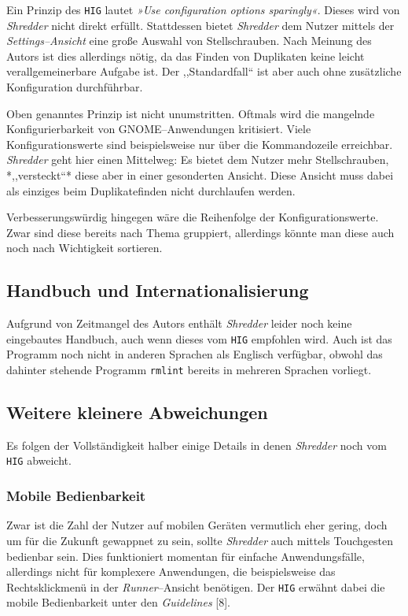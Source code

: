 \documentclass[11pt,ngerman,toc=listof,index=totoc]{scrreprt}
\begin{document}
Ein Prinzip des \texttt{HIG} lautet \emph{»Use configuration options
sparingly«}. Dieses wird von \emph{Shredder} nicht direkt erfüllt.
Stattdessen bietet \emph{Shredder} dem Nutzer mittels der
\emph{Settings--Ansicht} eine große Auswahl von Stellschrauben. Nach
Meinung des Autors ist dies allerdings nötig, da das Finden von
Duplikaten keine leicht verallgemeinerbare Aufgabe ist. Der
,,Standardfall`` ist aber auch ohne zusätzliche Konfiguration
durchführbar.

Oben genanntes Prinzip ist nicht unumstritten. Oftmals wird die
mangelnde Konfigurierbarkeit von GNOME--Anwendungen kritisiert. Viele
Konfigurationswerte sind beispielsweise nur über die Kommandozeile
erreichbar. \emph{Shredder} geht hier einen Mittelweg: Es bietet dem
Nutzer mehr Stellschrauben, *,,versteckt``* diese aber in einer
gesonderten Ansicht. Diese Ansicht muss dabei als einziges beim
Duplikatefinden nicht durchlaufen werden.

Verbesserungswürdig hingegen wäre die Reihenfolge der
Konfigurationswerte. Zwar sind diese bereits nach Thema gruppiert,
allerdings könnte man diese auch noch nach Wichtigkeit sortieren.

\subsection{Handbuch und
Internationalisierung}\label{handbuch-und-internationalisierung}

Aufgrund von Zeitmangel des Autors enthält \emph{Shredder} leider noch
keine eingebautes Handbuch, auch wenn dieses vom \texttt{HIG} empfohlen
wird. Auch ist das Programm noch nicht in anderen Sprachen als Englisch
verfügbar, obwohl das dahinter stehende Programm \texttt{rmlint} bereits
in mehreren Sprachen vorliegt.

\subsection{Weitere kleinere
Abweichungen}\label{weitere-kleinere-abweichungen}

Es folgen der Vollständigkeit halber einige Details in denen
\emph{Shredder} noch vom \texttt{HIG} abweicht.

\subsubsection{Mobile Bedienbarkeit}\label{mobile-bedienbarkeit}

Zwar ist die Zahl der Nutzer auf mobilen Geräten vermutlich eher gering,
doch um für die Zukunft gewappnet zu sein, sollte \emph{Shredder} auch
mittels Touchgesten bedienbar sein. Dies funktioniert momentan für
einfache Anwendungsfälle, allerdings nicht für komplexere Anwendungen,
die beispielsweise das Rechtsklickmenü in der \emph{Runner}--Ansicht
benötigen. Der \texttt{HIG} erwähnt dabei die mobile Bedienbarkeit unter
den \emph{Guidelines} {[}8{]}.
\end{document}
